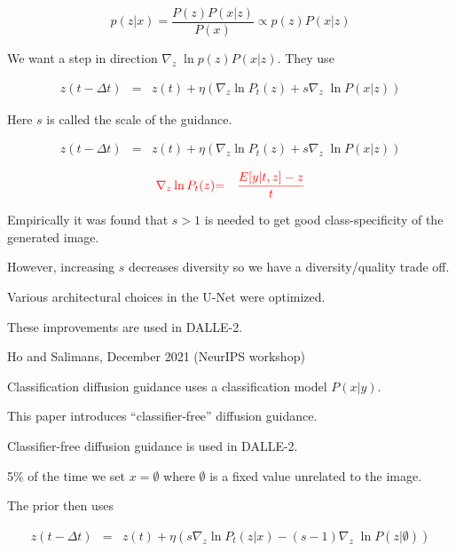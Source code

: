 {$$p(z|x) = \frac{P(z)P(x|z)}{P(x)} \propto p(z)P(x|z)$$

\vfill
We want a step in direction $\nabla_z\;\ln p(z)P(x|z)$. They use


\begin{eqnarray*}
z(t - \Delta t) & = & z(t) + \eta\left(\nabla_z\ln P_t(z) +  s \nabla_z\;\ln P(x|z)\right)
\end{eqnarray*}

\vfill
Here $s$ is called the scale of the guidance.


\begin{eqnarray*}
z(t - \Delta t) & = & z(t) + \eta\left(\nabla_z\ln P_t(z) + s \nabla_z\;\ln P(x|z)\right)
\end{eqnarray*}

\vfill
\begin{eqnarray*}
{\color{red} \nabla_z \ln P_t(z)}&  {\color{red}  =} & {\color{red}\frac{E[y|t,z]-z}{t}}
\end{eqnarray*}


\vfill
Empirically it was found that $s > 1$ is needed to get good class-specificity of the generated image.

\vfill
However, increasing $s$ decreases diversity so we have a diversity/quality trade off.


Various architectural choices in the U-Net were optimized.

\vfill
These improvements are used in DALLE-2.

{Ho and Salimans, December 2021 (NeurIPS workshop)}

Classification diffusion guidance uses a classification model $P(x|y)$.

\vfill
This paper introduces ``classifier-free'' diffusion guidance.

\vfill
Classifier-free diffusion guidance is used in DALLE-2.


5\% of the time we set $x = \emptyset$ where $\emptyset$ is a fixed value unrelated to the image.

\vfill
The prior then uses

\vfill
\begin{eqnarray*}
z(t - \Delta t) & = & z(t) + \eta\left(s\nabla_z\ln P_t(z|x) - (s-1) \nabla_z\;\ln P(z|\emptyset)\right)
\end{eqnarray*}

}
